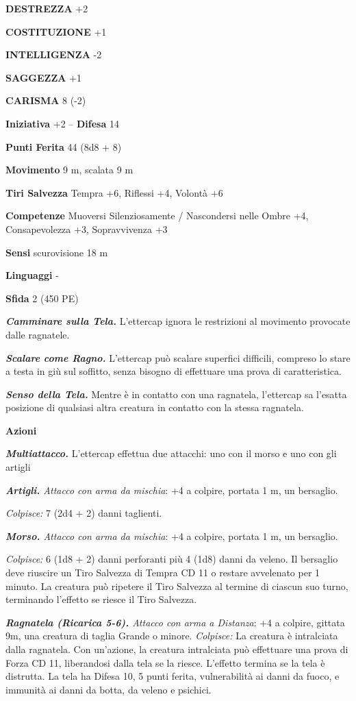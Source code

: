 \begin{multicols}{2}
\textbf{DESTREZZA} +2

\textbf{COSTITUZIONE} +1

\textbf{INTELLIGENZA} -2

\textbf{SAGGEZZA} +1

\textbf{CARISMA} 8 (-2)

\textbf{Iniziativa} +2 -- \textbf{Difesa} 14

\textbf{Punti Ferita} 44 (8d8 + 8)

\textbf{Movimento} 9 m, scalata 9 m

\textbf{Tiri Salvezza} Tempra +6, Riflessi +4, Volontà +6

\textbf{Competenze} Muoversi Silenziosamente / Nascondersi nelle Ombre +4, Consapevolezza +3, Sopravvivenza +3

\textbf{Sensi} scurovisione 18 m

\textbf{Linguaggi} -

\textbf{Sfida} 2 (450 PE)

\emph{\textbf{Camminare sulla Tela.}} L'ettercap ignora le restrizioni al movimento provocate dalle ragnatele.

\emph{\textbf{Scalare come Ragno.}} L'ettercap può scalare superfici difficili, compreso lo stare a testa in giù sul soffitto, senza bisogno di effettuare una prova di caratteristica.

\emph{\textbf{Senso della Tela.}} Mentre è in contatto con una ragnatela, l'ettercap sa l'esatta posizione di qualsiasi altra creatura in contatto con la stessa ragnatela.

\textbf{Azioni}

\emph{\textbf{Multiattacco.}} L'ettercap effettua due attacchi: uno con il morso e uno con gli artigli

\emph{\textbf{Artigli.} Attacco con arma da mischia}: +4 a colpire, portata 1 m, un bersaglio.

\emph{Colpisce:} 7 (2d4 + 2) danni taglienti.

\emph{\textbf{Morso.} Attacco con arma da mischia}: +4 a colpire, portata 1 m, un bersaglio.

\emph{Colpisce:} 6 (1d8 + 2) danni perforanti più 4 (1d8) danni da veleno. Il bersaglio deve riuscire un Tiro Salvezza di Tempra CD 11 o restare avvelenato per 1 minuto. La creatura può ripetere il Tiro Salvezza al termine di ciascun suo turno, terminando l'effetto se riesce il Tiro Salvezza.

\emph{\textbf{Ragnatela (Ricarica 5-6).} Attacco con arma a Distanza}: +4 a colpire, gittata 9m, una creatura di taglia Grande o minore. \emph{Colpisce:} La creatura è intralciata dalla ragnatela. Con un'azione, la creatura intralciata può effettuare una prova di Forza CD 11, liberandosi dalla tela se la riesce. L'effetto termina se la tela è distrutta. La tela ha Difesa 10, 5 punti ferita, vulnerabilità ai danni da fuoco, e immunità ai danni da botta, da veleno e psichici.


\end{multicols}
